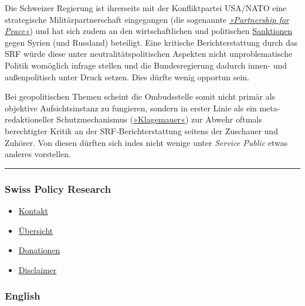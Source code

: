 Die Schweizer Regierung ist ihrerseits mit der Konfliktpartei USA/NATO
eine strategische Militärpartnerschaft eingegangen (die sogenannte
\emph{\href{https://www.eda.admin.ch/eda/de/home/aussenpolitik/internationale-organisationen/nato-partnerschaftfuerdenfrieden.html}{»Partnership
for Peace«}}) und hat sich zudem an den wirtschaftlichen und politischen
\href{https://www.nzz.ch/bundesrat_beschliesst_sanktionen_gegen_syrien-1.10621855}{Sanktionen}
gegen Syrien (und Russland) beteiligt. Eine kritische Berichterstattung
durch das SRF würde diese unter neutralitätspolitischen Aspekten nicht
unproblematische Politik womöglich infrage stellen und die
Bundesregierung dadurch innen- und außenpolitisch unter Druck setzen.
Dies dürfte wenig opportun sein.

Bei geopolitischen Themen scheint die Ombudsstelle somit nicht primär
als objektive Aufsichtsinstanz zu fungieren, sondern in erster Linie als
ein meta-redaktioneller Schutz­mechanismus
(\href{http://www.werbewoche.ch/medien/2016-03-29/srg-ombudsstelle-sieht-sich-als-klagemauer}{»Klagemauer«})
zur Abwehr oftmals berechtigter Kritik an der SRF-Bericht­erstattung
seitens der Zuschauer und Zuhörer. Von diesen dürften sich indes nicht
wenige unter \emph{Service Public} etwas anderes vorstellen.

\begin{center}\rule{0.5\linewidth}{\linethickness}\end{center}

\hypertarget{swiss-policy-research}{%
\subsubsection{Swiss Policy Research}\label{swiss-policy-research}}

\begin{itemize}
\tightlist
\item
  \href{https://swprs.org/kontakt/}{Kontakt}
\item
  \href{https://swprs.org/uebersicht/}{Übersicht}
\item
  \href{https://swprs.org/donationen/}{Donationen}
\item
  \href{https://swprs.org/disclaimer/}{Disclaimer}
\end{itemize}

\hypertarget{english}{%
\subsubsection{English}\label{english}}

